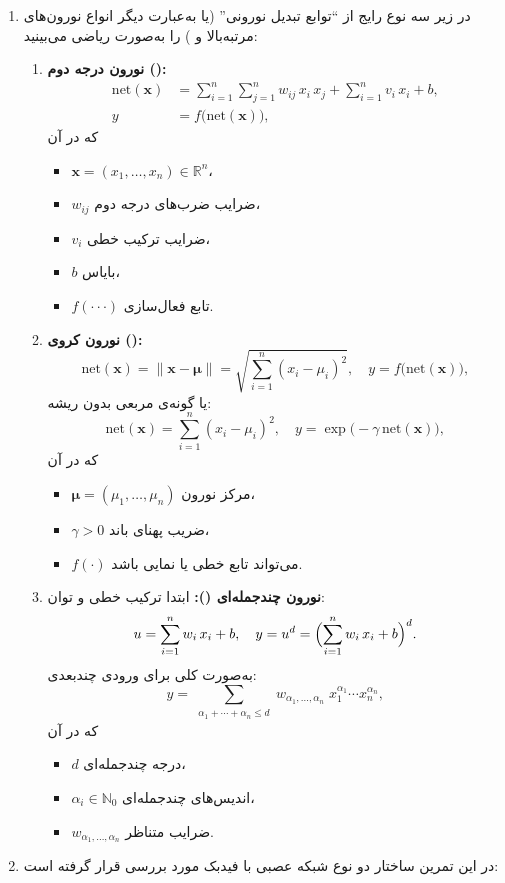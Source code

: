 \begin{enumerate}
	\item در زیر سه نوع رایج از “توابع تبدیل نورونی” (یا به‌عبارت دیگر انواع نورون‌های مرتبه‌بالا و ) را به‌صورت ریاضی می‌بینید:
	\begin{enumerate}
		\item \textbf{نورون درجه دوم ():}
		\[
		\begin{aligned}
			\mathrm{net}(\mathbf{x})
			&= \sum_{i=1}^n \sum_{j=1}^n w_{ij}\,x_i\,x_j
			+ \sum_{i=1}^n v_i\,x_i
			+ b,\\
			y &= f\bigl(\mathrm{net}(\mathbf{x})\bigr),
		\end{aligned}
		\]
		که در آن
		\begin{itemize}
			\item $\mathbf{x}=(x_1,\dots,x_n)\in\mathbb{R}^n$،
			\item $w_{ij}$ ضرایب ضرب‌های درجه دوم،
			\item $v_i$ ضرایب ترکیب خطی،
			\item $b$ بایاس،
			\item $f(\cdot\cdot\cdot)$ تابع فعال‌سازی.
		\end{itemize}
		
		\item \textbf{نورون کروی ():}
		\[
		\mathrm{net}(\mathbf{x})
		= \bigl\lVert \mathbf{x} - \boldsymbol{\mu}\bigr\rVert
		= \sqrt{\sum_{i=1}^n (x_i - \mu_i)^2},
		\quad
		y = f\bigl(\mathrm{net}(\mathbf{x})\bigr),
		\]
		یا گونه‌ی مربعی بدون ریشه:
		\[
		\mathrm{net}(\mathbf{x})
		= \sum_{i=1}^n (x_i - \mu_i)^2,
		\quad
		y = \exp\bigl(-\gamma\,\mathrm{net}(\mathbf{x})\bigr),
		\]
		که در آن
		\begin{itemize}
			\item $\boldsymbol{\mu}=(\mu_1,\dots,\mu_n)$ مرکز نورون،
			\item $\gamma>0$ ضریب پهنای باند،
			\item $f(\cdot)$ می‌تواند تابع خطی یا نمایی باشد.
		\end{itemize}
		
		\item \textbf{نورون چندجمله‌ای ():}
		ابتدا ترکیب خطی و توان:
		\[
		u = \sum_{i=1}^n w_i\,x_i + b,
		\quad
		y = u^d
		= \Bigl(\sum_{i=1}^n w_i\,x_i + b\Bigr)^{d}.
		\]
		به‌صورت کلی برای ورودی چندبعدی:
		\[
		y 
		= \sum_{\substack{\alpha_1+\cdots+\alpha_n \le d}}
		w_{\alpha_1,\dots,\alpha_n}
		\;x_1^{\alpha_1}\cdots x_n^{\alpha_n},
		\]
		که در آن
		\begin{itemize}
			\item $d$ درجه چندجمله‌ای،
			\item $\alpha_i\in\mathbb{N}_0$ اندیس‌های چندجمله‌ای،
			\item $w_{\alpha_1,\dots,\alpha_n}$ ضرایب متناظر.
		\end{itemize}
	\end{enumerate}
	\item در این تمرین ساختار دو نوع شبکه عصبی با فیدبک مورد بررسی قرار گرفته است:
	

\end{enumerate}
